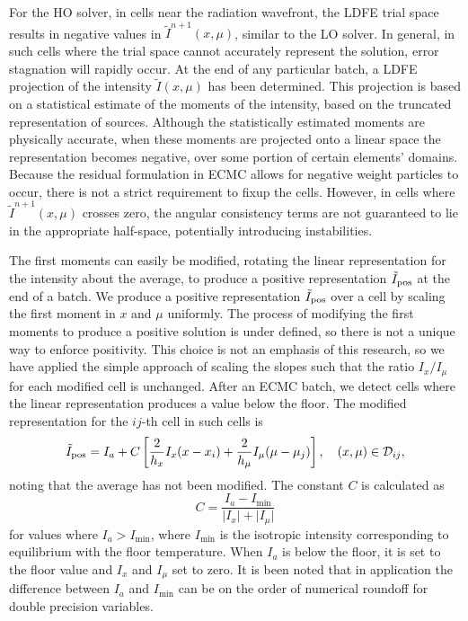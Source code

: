 For the HO solver, in cells near the radiation wavefront, the LDFE trial space results in
negative values in $\tilde{I}^{n+1}(x,\mu)$, similar to the LO solver.  In general, in
such cells where the trial space cannot accurately represent the solution, error
stagnation will rapidly occur.  At the end of any particular batch, a LDFE projection of
the intensity $\tilde I(x,\mu)$ has been determined.  This projection is based on a
statistical estimate of the moments of the intensity, based on the truncated
representation of sources.  Although the statistically estimated moments are physically
accurate, when these moments are projected onto a linear space the representation becomes
negative, over some portion of certain elements' domains.  Because the residual
formulation in ECMC allows for negative weight particles to occur, there is not a strict
requirement to fixup the cells.  However, in cells where $\tilde{I}^{n+1}(x,\mu)$ crosses
zero, the angular consistency terms are not guaranteed to lie in the appropriate
half-space, potentially introducing instabilities.  

The first moments can easily be modified, rotating the linear representation for the intensity
about the average, to produce a positive representation $\tilde
I_{{\text{pos}}}$ at the end of a batch.  We produce a positive representation $\tilde
I_{\text{{\text{pos}}}}$ over a cell by scaling the first moment in $x$ and $\mu$ uniformly.  The
process of modifying the first moments to produce a positive solution is under defined, so
there is not a unique way to enforce positivity.  This choice is not an emphasis of this
research, so we have applied the simple approach of scaling the slopes such that
the ratio $I_x/I_\mu$ for each modified cell is unchanged.  After an ECMC batch, we
detect cells where the linear representation produces a value below the floor.    The
modified representation for the $ij$-th cell in such cells is
\begin{equation}
    \tilde I_{{\text{pos}}} = I_{a} + C\left[\frac{2}{h_x}I_x(x-x_i) +
    \frac{2}{h_\mu}I_\mu(\mu-\mu_j)\right],\quad     (x,\mu) \in \mathcal{D}_{ij},
\end{equation}
noting that the average has not been modified.
The constant $C$ is calculated as
\begin{equation}
    C =  \frac{I_{a} - I_{\min}}{\lvert I_x \rvert + \lvert I_\mu \rvert}
\end{equation}
for values where $I_{a} > I_{\min}$, where $I_{\min}$ is the isotropic intensity
corresponding to equilibrium with the floor temperature.  When $I_a$ is below the floor, it is set to
the floor value and $I_x$ and $I_\mu$ set to zero.  It is been noted that in application
the difference between $I_{a}$ and $I_{\min}$ can be on the order of numerical roundoff for
double precision variables.

